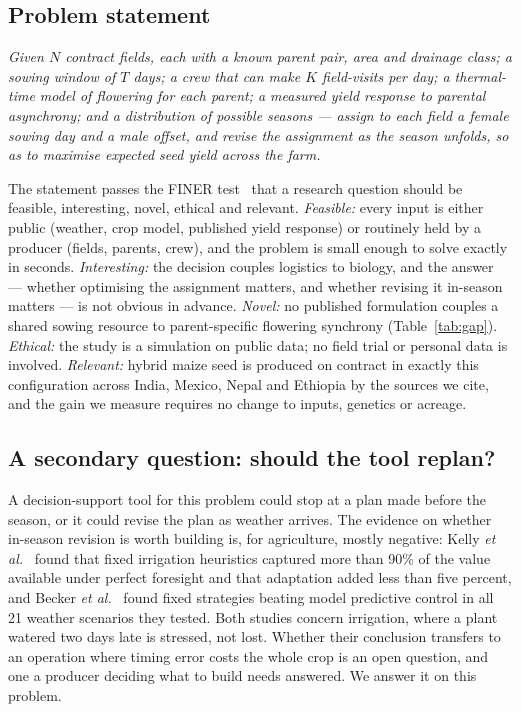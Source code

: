 \documentclass[10pt,twocolumn]{article}
\begin{document}
\subsection{Problem statement}

\emph{Given $N$ contract fields, each with a known parent pair, area and
drainage class; a sowing window of $T$ days; a crew that can make $K$
field-visits per day; a thermal-time model of flowering for each parent; a
measured yield response to parental asynchrony; and a distribution of
possible seasons --- assign to each field a female sowing day and a male
offset, and revise the assignment as the season unfolds, so as to maximise
expected seed yield across the farm.}

The statement passes the FINER test~\cite{hulley2013} that a research
question should be feasible, interesting, novel, ethical and relevant.
\emph{Feasible:} every input is either public (weather, crop model,
published yield response) or routinely held by a producer (fields, parents,
crew), and the problem is small enough to solve exactly in seconds.
\emph{Interesting:} the decision couples logistics to biology, and the
answer --- whether optimising the assignment matters, and whether revising
it in-season matters --- is not obvious in advance. \emph{Novel:} no
published formulation couples a shared sowing resource to parent-specific
flowering synchrony (Table~\ref{tab:gap}). \emph{Ethical:} the study is a
simulation on public data; no field trial or personal data is involved.
\emph{Relevant:} hybrid maize seed is produced on contract in exactly this
configuration across India, Mexico, Nepal and Ethiopia by the sources we
cite, and the gain we measure requires no change to inputs, genetics or
acreage.

\subsection{A secondary question: should the tool replan?}

A decision-support tool for this problem could stop at a plan made before
the season, or it could revise the plan as weather arrives. The evidence on
whether in-season revision is worth building is, for agriculture, mostly
negative: Kelly \textit{et al.}~\cite{kelly2023} found that fixed irrigation
heuristics captured more than 90\% of the value available under perfect
foresight and that adaptation added less than five percent, and Becker
\textit{et al.}~\cite{becker2026} found fixed strategies beating model
predictive control in all 21 weather scenarios they tested. Both studies
concern irrigation, where a plant watered two days late is stressed, not
lost. Whether their conclusion transfers to an operation where timing error
costs the whole crop is an open question, and one a producer deciding what
to build needs answered. We answer it on this problem.
\end{document}
